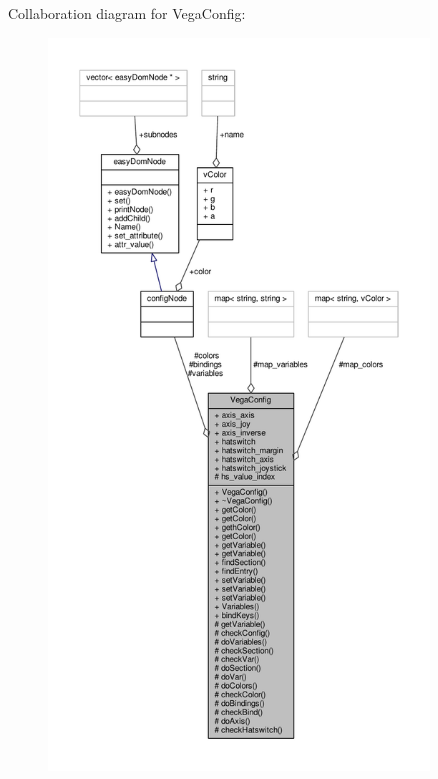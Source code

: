 Collaboration diagram for Vega\+Config\+:
\nopagebreak
\begin{figure}[H]
\begin{center}
\leavevmode
\includegraphics[height=550pt]{d9/d3c/classVegaConfig__coll__graph}
\end{center}
\end{figure}
